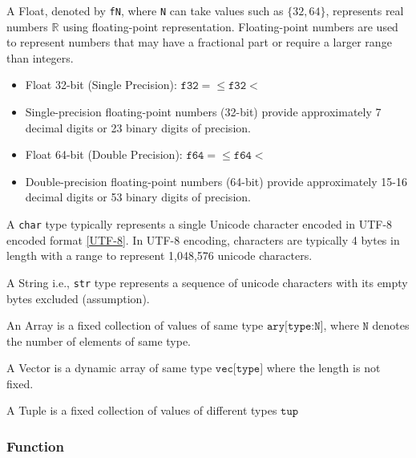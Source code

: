 \documentclass[../alan-handbook.tex]{subfiles}
\begin{document}
 \label{Floating-Integer}

A Float, denoted by \texttt{fN}, where \texttt{N} can take values such as $\{32, 64\}$, represents real numbers $\mathbb{R}$ using floating-point representation. Floating-point numbers are used to represent numbers that may have a fractional part or require a larger range than integers.

\begin{itemize}
    \item Float 32-bit (Single Precision): $ \texttt{f32} =  \leq \texttt{f32} < $ 
    \item Single-precision floating-point numbers (32-bit) provide approximately 7 decimal digits or 23 binary digits of precision. 
    \item Float 64-bit (Double Precision): $ \texttt{f64} =  \leq \texttt{f64} < $ 
    \item Double-precision floating-point numbers (64-bit) provide approximately 15-16 decimal digits or 53 binary digits of precision. 
\end{itemize}

 \label{Character}

A \texttt{char} type typically represents a single Unicode character encoded in UTF-8 encoded format \ref{UTF-8}. In UTF-8 encoding, characters are typically 4 bytes in length with a range to represent 1,048,576 unicode characters.

 \label{String}

A String i.e., \texttt{str} type represents a sequence of unicode characters with its empty bytes excluded (assumption).

 \label{Array}

An Array is a fixed collection of values of same type ${\texttt{ary[type:N]}}$, where $\texttt{N}$ denotes the number of elements of same type.


 \label{Vector}

A Vector is a dynamic array of same type ${\texttt{vec[type]}}$ where the length is not fixed.


 \label{Tuple}

A Tuple is a fixed collection of values of different types ${\texttt{tup}}$ 

\subsubsection{Function} \label{Function}
\end{document}
